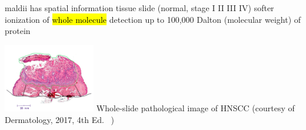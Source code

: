\documentclass[
paper=landscape,
paper=160mm:90mm, %
fontsize=11pt, %
pagesize, %
parskip=half-, %
]{scrartcl} %
\theoremstyle{mythmstyle} %
\begin{document}
{%
\begin{minipage}[c]{0.65\linewidth}
\begin{outline}
\1 \acrfull{maldii} has spatial information
\1 tissue slide (normal, stage I II III IV)
\1 softer ionization of \hl{whole molecule}
\1 detection up to 100,000 Dalton (molecular weight) of protein
\end{outline}
\end{minipage}
\begin{minipage}[c]{0.25\linewidth}
    \includegraphics[width=4cm]{GCNN_for_surgical_margin_HE.pdf}
{\tiny Whole-slide pathological image of HNSCC (courtesy of Dermatology, 2017, 4th Ed.~\autocite{Bolognia2017} )}
\end{minipage}




}
\end{document}
